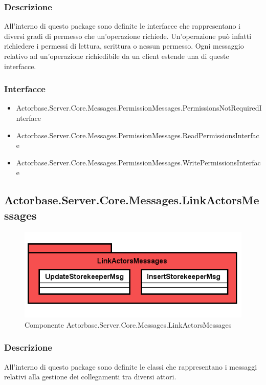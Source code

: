 \documentclass[a4paper]{article}
\begin{document}
			\subsubsection{Descrizione}
				All'interno di questo package sono definite le interfacce che rappresentano i diversi gradi di permesso che un'operazione richiede. Un'operazione può infatti richiedere i permessi di lettura, scrittura o nessun permesso. Ogni messaggio relativo ad un'operazione richiedibile da un client estende una di queste interfacce.
			\subsubsection{Interfacce}
			\begin{itemize}
				\item Actorbase.Server.Core.Messages.PermissionMessages.PermissionsNotRequiredInterface
				\item Actorbase.Server.Core.Messages.PermissionMessages.ReadPermissionsInterface
				\item Actorbase.Server.Core.Messages.PermissionMessages.WritePermissionsInterface
			\end{itemize}
			
			\subsection{Actorbase.Server.Core.Messages.LinkActorsMessages}
			\begin{figure} [H]
			\centering
			\includegraphics[scale=0.65]{Server/Package/LinkActorsMessagesLevel.png}
			\caption{Componente Actorbase.Server.Core.Messages.LinkActorsMessages}
			\end{figure}
			\subsubsection{Descrizione}
				All'interno di questo package sono definite le classi che rappresentano i messaggi relativi alla gestione dei collegamenti tra diversi attori.
\end{document}
